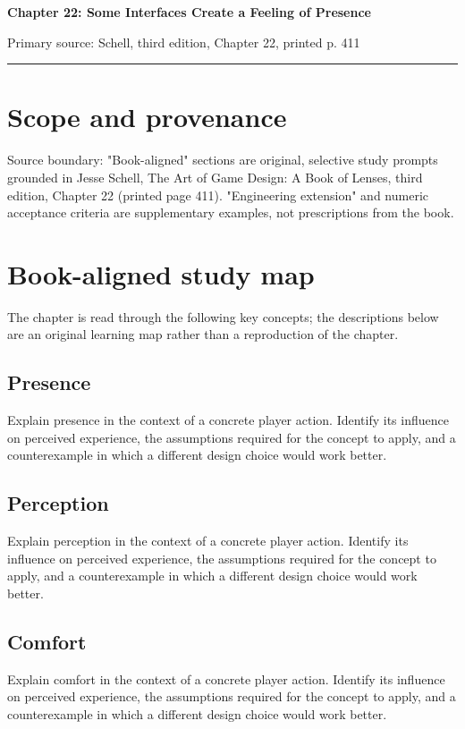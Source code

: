 \documentclass[11pt]{article}
\begin{document}
{\huge\bfseries\color{suiteblue} Chapter 22: Some Interfaces Create a Feeling of Presence}\par
\vspace{0.15in}
{\normalsize\color{suitegray} Primary source: Schell, third edition, Chapter 22, printed p. 411}\par
\vspace{0.15in}\hrule\vspace{0.15in}

\section{Scope and provenance}
Source boundary: "Book-aligned" sections are original, selective study prompts grounded in Jesse Schell, The Art of Game Design: A Book of Lenses, third edition, Chapter 22 (printed page 411). "Engineering extension" and numeric acceptance criteria are supplementary examples, not prescriptions from the book.


\section{Book-aligned study map}
The chapter is read through the following key concepts; the descriptions below are an original learning map rather than a reproduction of the chapter.


\subsection{Presence}
Explain presence in the context of a concrete player action. Identify its influence on perceived experience, the assumptions required for the concept to apply, and a counterexample in which a different design choice would work better.


\subsection{Perception}
Explain perception in the context of a concrete player action. Identify its influence on perceived experience, the assumptions required for the concept to apply, and a counterexample in which a different design choice would work better.


\subsection{Comfort}
Explain comfort in the context of a concrete player action. Identify its influence on perceived experience, the assumptions required for the concept to apply, and a counterexample in which a different design choice would work better.
\end{document}
